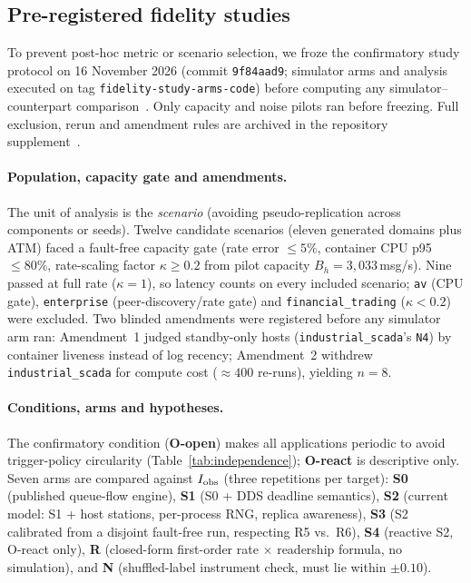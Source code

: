 \subsection{Pre-registered fidelity studies}
\label{sec:protocol}

To prevent post-hoc metric or scenario selection, we froze the confirmatory study protocol on 16 November 2026 (commit \texttt{9f84aad9}; simulator arms and analysis executed on tag \texttt{fidelity-study-arms-code}) before computing any simulator--counterpart comparison~\citep{sag-software}. Only capacity and noise pilots ran before freezing. Full exclusion, rerun and amendment rules are archived in the repository supplement~\citep{sag-software}.

\paragraph{Population, capacity gate and amendments.} The unit of analysis is the \emph{scenario} (avoiding pseudo-replication across components or seeds). Twelve candidate scenarios (eleven generated domains plus ATM) faced a fault-free capacity gate (rate error $\le 5\%$, container CPU p95 $\le 80\%$, rate-scaling factor $\kappa \ge 0.2$ from pilot capacity $B_h = 3{,}033$\,msg/s). Nine passed at full rate ($\kappa = 1$), so latency counts on every included scenario; \texttt{av} (CPU gate), \texttt{enterprise} (peer-discovery/rate gate) and \texttt{financial\_trading} ($\kappa < 0.2$) were excluded. Two blinded amendments were registered before any simulator arm ran: Amendment~1 judged standby-only hosts (\texttt{industrial\_scada}'s \texttt{N4}) by container liveness instead of log recency; Amendment~2 withdrew \texttt{industrial\_scada} for compute cost ($\approx 400$ re-runs), yielding $n = 8$.

\paragraph{Conditions, arms and hypotheses.} The confirmatory condition (\textbf{O-open}) makes all applications periodic to avoid trigger-policy circularity (Table~\ref{tab:independence}); \textbf{O-react} is descriptive only. Seven arms are compared against $I_{\mathrm{obs}}$ (three repetitions per target): \textbf{S0} (published queue-flow engine), \textbf{S1} (S0 + DDS deadline semantics), \textbf{S2} (current model: S1 + host stations, per-process RNG, replica awareness), \textbf{S3} (S2 calibrated from a disjoint fault-free run, respecting R5 vs.\ R6), \textbf{S4} (reactive S2, O-react only), \textbf{R} (closed-form first-order rate $\times$ readership formula, no simulation), and \textbf{N} (shuffled-label instrument check, must lie within $\pm 0.10$).

